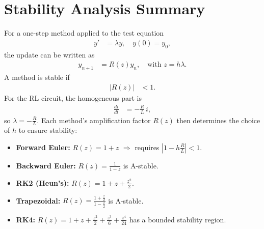 \documentclass[12pt]{article}
\begin{document}
\section{Stability Analysis Summary}
For a one-step method applied to the test equation 
\begin{align}
y' &= \lambda y, \quad y(0)=y_0,
\end{align}
the update can be written as 
\begin{align}
y_{n+1} &= R(z)y_n, \quad \text{with } z = h\lambda.
\end{align}
A method is stable if 
\begin{align}
|R(z)| &< 1.
\end{align}
For the RL circuit, the homogeneous part is 
\begin{align}
\frac{di}{dt} &= -\frac{R}{L}\, i,
\end{align}
so $\lambda=-\frac{R}{L}$. Each method’s amplification factor $R(z)$ then determines the choice of $h$ to ensure stability:
\begin{itemize}
    \item \textbf{Forward Euler:} $R(z)=1+z$ $\Rightarrow$ requires $\left|1-h\frac{R}{L}\right|<1$.
    \item \textbf{Backward Euler:} $R(z)=\frac{1}{1-z}$ is A-stable.
    \item \textbf{RK2 (Heun's):} $R(z)=1+z+\frac{z^2}{2}$.
    \item \textbf{Trapezoidal:} $R(z)=\frac{1+\frac{z}{2}}{1-\frac{z}{2}}$ is A-stable.
    \item \textbf{RK4:} $R(z)=1+z+\frac{z^2}{2}+\frac{z^3}{6}+\frac{z^4}{24}$ has a bounded stability region.
\end{itemize}
\end{document}
